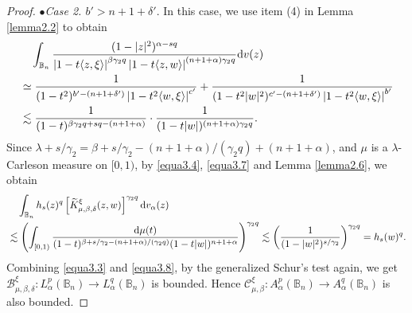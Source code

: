 \documentclass[preprint,12pt,times]{elsarticle}
\theoremstyle{definition}
\theoremstyle{remark}
\numberwithin{equation}{section}
\begin{document}
\begin{proof}
$\bullet${\it Case 2. $b'>n+1+\delta'$}. In this case, we use item (4) in Lemma \ref{lemma2.2} to obtain
\begin{equation}\label{equa3.7}
\begin{split}
&\quad \int_{\mathbb{B}_n}\frac{(1-|z|^2)^{\alpha-sq}}{\left|1-t\langle z,\xi\rangle\right|^{\beta\gamma_2 q}\left|1-t\langle z,w\rangle\right|^{(n+1+\alpha)\gamma_2q}}{\rm d}v(z)\\
&\simeq \frac{1}{(1-t^2)^{b'-(n+1+\delta')}\left|1-t^2\langle w,\xi\rangle\right|^{c'}}+\frac{1}{(1-t^2|w|^2)^{c'-(n+1+\delta')}\left|1-t^2\langle w,\xi\rangle\right|^{b'}}\\
&\lesssim \frac{1}{(1-t)^{\beta\gamma_2 q+sq-(n+1+\alpha)}}\cdot\frac{1}{(1-t|w|)^{(n+1+\alpha)\gamma_2q}}.
\end{split}
\end{equation}
Since $\lambda+s/\gamma_2=\beta+s/\gamma_2-(n+1+\alpha)/(\gamma_2 q)+(n+1+\alpha)$, and $\mu$ is a $\lambda$-Carleson measure on $[0,1)$, by \eqref{equa3.4}, \eqref{equa3.7} and Lemma \ref{lemma2.6}, we obtain
\begin{equation}\label{equa3.8}
\begin{split}
&\quad \int_{\mathbb{B}_n}h_s(z)^q\left[\widetilde{K}_{\mu,\beta,\delta}^{\xi}(z,w)\right]^{\gamma_2q}{\rm d}v_{\alpha}(z)\\
&\lesssim \left(\int_{[0,1)}\frac{{\rm d}\mu(t)}{(1-t)^{\beta+s/\gamma_2-(n+1+\alpha)/(\gamma_2q)}(1-t|w|)^{n+1+\alpha}}\right)^{\gamma_2q}\lesssim \left(\frac{1}{(1-|w|^2)^{s/\gamma_2}}\right)^{\gamma_2 q}=h_s(w)^q.
\end{split}
\end{equation}
Combining \eqref{equa3.3} and \eqref{equa3.8}, by the generalized Schur's test again, we get $\mathcal{B}_{\mu,\beta,\delta}^{\xi}: L_{\alpha}^p(\mathbb{B}_n)\to L_{\alpha}^q(\mathbb{B}_n)$ is bounded. Hence  $\mathcal{C}_{\mu,\beta}^{\xi}: A_{\alpha}^p(\mathbb{B}_n)\to A_{\alpha}^q(\mathbb{B}_n)$ is also bounded.


\end{proof}
\end{document}

